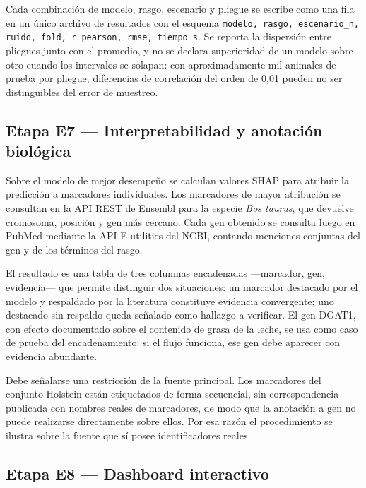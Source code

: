 \documentclass[conference]{IEEEtran}
\begin{document}
Cada combinación de modelo, rasgo, escenario y pliegue se escribe como una
fila en un único archivo de resultados con el esquema \texttt{modelo,
rasgo, escenario\_n, ruido, fold, r\_pearson, rmse, tiempo\_s}. Se reporta
la dispersión entre pliegues junto con el promedio, y no se declara
superioridad de un modelo sobre otro cuando los intervalos se solapan: con
aproximadamente mil animales de prueba por pliegue, diferencias de
correlación del orden de 0{,}01 pueden no ser distinguibles del error de
muestreo.

\subsection{Etapa E7 — Interpretabilidad y anotación biológica}

Sobre el modelo de mejor desempeño se calculan valores SHAP para atribuir
la predicción a marcadores individuales. Los marcadores de mayor
atribución se consultan en la API REST de Ensembl para la especie
\textit{Bos taurus}, que devuelve cromosoma, posición y gen más cercano.
Cada gen obtenido se consulta luego en PubMed mediante la API E-utilities
del NCBI, contando menciones conjuntas del gen y de los términos del
rasgo.

El resultado es una tabla de tres columnas encadenadas —marcador, gen,
evidencia— que permite distinguir dos situaciones: un marcador destacado
por el modelo y respaldado por la literatura constituye evidencia
convergente; uno destacado sin respaldo queda señalado como hallazgo a
verificar. El gen DGAT1, con efecto documentado sobre el contenido de
grasa de la leche, se usa como caso de prueba del encadenamiento: si el
flujo funciona, ese gen debe aparecer con evidencia abundante.

Debe señalarse una restricción de la fuente principal. Los marcadores del
conjunto Holstein están etiquetados de forma secuencial, sin
correspondencia publicada con nombres reales de marcadores, de modo que la
anotación a gen no puede realizarse directamente sobre ellos. Por esa
razón el procedimiento se ilustra sobre la fuente que sí posee
identificadores reales.

\subsection{Etapa E8 — Dashboard interactivo}
\end{document}
